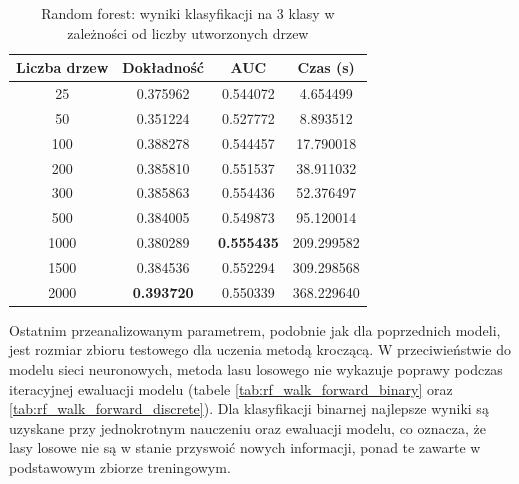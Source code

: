 \documentclass[a4paper, twoside, 11pt, openright]{article}
\begin{document}
\begin{table}[H]
    \centering
    \begin{tabular}{|c|c|c|c|}
    \hline
        \textbf{Liczba drzew} & \textbf{Dokładność} & \textbf{AUC} & \textbf{Czas (s)} \\ \hline
25         &  0.375962 &  0.544072 &    4.654499 \\ \hline
50         &  0.351224 &  0.527772 &    8.893512 \\ \hline
100       &  0.388278 &  0.544457 &   17.790018 \\ \hline
200        &  0.385810 &  0.551537 &   38.911032 \\ \hline
300        &  0.385863 &  0.554436 &   52.376497 \\ \hline
500        &  0.384005 &  0.549873 &   95.120014 \\ \hline
1000       &  0.380289 &  \textbf{0.555435} &  209.299582 \\ \hline
1500       &  0.384536 &  0.552294 &  309.298568 \\ \hline
2000      &  \textbf{0.393720} &  0.550339 &  368.229640 \\ \hline
    \end{tabular}
    \caption{Random forest: wyniki klasyfikacji na 3 klasy w zależności od liczby utworzonych drzew}
    \label{tab:rf_estimators_discrete}
\end{table}

Ostatnim przeanalizowanym parametrem, podobnie jak dla poprzednich modeli, jest rozmiar zbioru testowego dla uczenia metodą kroczącą. W przeciwieństwie do modelu sieci neuronowych, metoda lasu losowego nie wykazuje poprawy podczas iteracyjnej ewaluacji modelu (tabele \ref{tab:rf_walk_forward_binary} oraz \ref{tab:rf_walk_forward_discrete}). Dla klasyfikacji binarnej najlepsze wyniki są uzyskane przy jednokrotnym nauczeniu oraz ewaluacji modelu, co oznacza, że lasy losowe nie są w stanie przyswoić nowych informacji, ponad te zawarte w podstawowym zbiorze treningowym.
\end{document}

